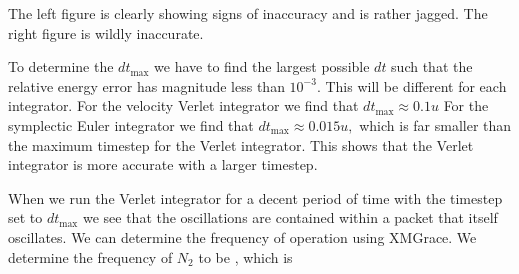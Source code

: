 \documentclass[12pt]{article}
\begin{document}
	The left figure is clearly showing signs of inaccuracy and is rather jagged. The right figure is wildly inaccurate.
	
	To determine the $dt_{\text{max}}$ we have to find the largest possible $dt$ such that the relative energy error has magnitude less than $10^{-3}$. This will be different for each integrator. For the velocity Verlet integrator we find that $dt_{\text{max}} \approx 0.1u $ For the symplectic Euler integrator we find that $dt_{\text{max}} \approx 0.015u,$ which is far smaller than the maximum timestep for the Verlet integrator. This shows that the Verlet integrator is more accurate with a larger timestep. 
	
When we run the Verlet integrator for a decent period of time with the timestep set to $dt_{\text{max}}$ we see that the oscillations are contained within a packet that itself oscillates. We can determine the frequency of operation using XMGrace. We determine the frequency of $N_2$ to be $ $, which is 
\end{document}
